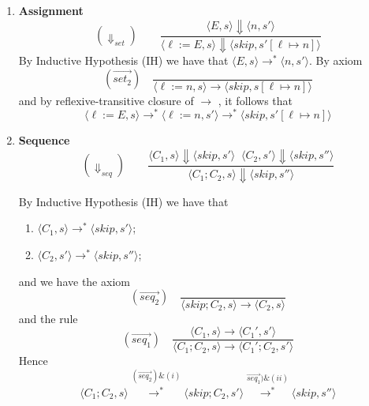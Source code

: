 \begin{solution}
\begin{enumerate}[label=(\alph*)]
\begin{enumerate}[label=(\alph{enumi}).\arabic*]
  Hence 
 \[\langle E_1 \, op \, E_2,s\rangle \overset{(i)}{\rightarrow^*} \langle n_1 \, op \, E_2,s'\rangle \overset{(ii)}{\rightarrow^*} \langle n_1 \, op \, n_2,s''\rangle \overset{(\overset{\rightarrow}{op_3})}{\rightarrow}  \langle c, s''\rangle \]
 which can be rewritten as
  \[\langle E_1 \, op \, E_2,s\rangle {\rightarrow^*}  \langle c, s''\rangle \]
  \item \textbf{Assignment}
 \[ (\Downarrow_{set}) \quad  \quad \frac{\langle E,s\rangle \Downarrow \langle n, s'\rangle }{\langle \ell:=E,s\rangle \Downarrow \langle skip, s'[\ell \mapsto n]\rangle}\]
 By Inductive Hypothesis (IH) we have that $\langle E,s\rangle \rightarrow^* \langle n, s'\rangle$. By axiom 
   \[ (\overset{\rightarrow}{set_2}) \quad \frac{}{\langle \ell:=n,s\rangle \to \langle skip, s[\ell \mapsto n]\rangle}\]
 and by reflexive-transitive closure of $\rightarrow$ , it follows that
  \[ \langle \ell:=E,s\rangle \to^* \langle \ell:=n,s'\rangle \rightarrow^* \langle skip, s'[\ell \mapsto n]\rangle\]

    \item \textbf{Sequence}
 \[ (\Downarrow_{seq}) \quad  \quad \frac{\langle C_1,s\rangle \Downarrow\langle skip, s' \rangle \; \; \langle C_2, s' \rangle \Downarrow\langle skip, s''\rangle}{\langle C_1;C_2, s\rangle \Downarrow\langle skip, s''\rangle}\]

 By Inductive Hypothesis (IH) we have that 
 \begin{enumerate}[label=(\roman*)]
     \item $\langle C_1,s\rangle \to^*\langle skip, s' \rangle$;
     \item $\langle C_2, s' \rangle \to^*\langle skip, s''\rangle$;
 \end{enumerate}
 and we have the axiom
     \[ (\overset{\rightarrow}{seq_2}) \quad \frac{}{\langle skip;C_2,s\rangle \to \langle C_2,s\rangle}\]
     and the rule 
      \[ (\overset{\rightarrow}{seq_1}) \quad \frac{\langle C_1,s\rangle \to \langle C_1', s'\rangle}{\langle C_1;C_2,s\rangle \to \langle C_1';C_2, s'\rangle}\]
      Hence 
       \[ \langle C_1;C_2,s\rangle \overset{(\overset{\rightarrow}{seq_2}) \& (i)}{\to^*} \langle skip;C_2, s'\rangle \overset{\overset{\rightarrow}{seq_1}) \& (ii)}{\to^*} \langle skip, s''\rangle\]


\end{enumerate}
\end{enumerate}
\end{solution}
